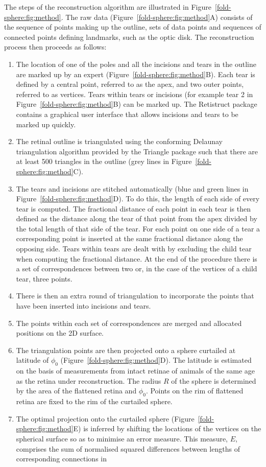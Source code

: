 \documentclass[10pt]{article}
\begin{document}
The steps of the reconstruction algorithm are illustrated in
Figure~\ref{fold-sphere:fig:method}. The raw data
(Figure~\ref{fold-sphere:fig:method}A) consists of the sequence of
points making up the outline, sets of data points and sequences of
connected points defining landmarks, such as the optic disk. The
reconstruction process then proceeds as follows:
\begin{enumerate}
\item The location of one of the poles and all the incisions and tears
  in the outline are marked up by an expert
  (Figure~\ref{fold-sphere:fig:method}B). Each tear is defined by a
  central point, referred to as the apex, and two outer points,
  referred to as vertices.  Tears within tears or incisions (for
  example tear 2 in Figure~\ref{fold-sphere:fig:method}B) can be
  marked up. The Retistruct package contains a graphical user
  interface that allows incisions and tears to be marked up quickly.
\item The retinal outline is triangulated using the conforming
  Delaunay triangulation algorithm provided by the Triangle package
  \cite{Shew96tria} such that there are at least 500 triangles in
  the outline (grey lines in Figure~\ref{fold-sphere:fig:method}C).
\item The tears and incisions are stitched automatically (blue and
  green lines in Figure~\ref{fold-sphere:fig:method}D). To do this,
  the length of each side of every tear is computed. The fractional
  distance of each point in each tear is then defined as the distance
  along the tear of that point from the apex divided by the total
  length of that side of the tear. For each point on one side of a
  tear a corresponding point is inserted at the same fractional
  distance along the opposing side. Tears within tears are dealt with
  by excluding the child tear when computing the fractional
  distance. At the end of the procedure there is a set of
  correspondences between two or, in the case of the vertices of a
  child tear, three points.
\item There is then an extra round of triangulation to incorporate the
  points that have been inserted into incisions and tears.
\item The points within each set of correspondences are merged and
  allocated positions on the 2D surface.
\item The triangulation points are then projected onto a sphere
  curtailed at latitude of $\phi_0$
  (Figure~\ref{fold-sphere:fig:method}D). The latitude is estimated on
  the basis of measurements from intact retinae of animals of the same
  age as the retina under reconstruction. The radius $R$ of the sphere
  is determined by the area of the flattened retina and $\phi_0$.
  Points on the rim of flattened retina are fixed to the rim of the
  curtailed sphere.
\item The optimal projection onto the curtailed sphere
  (Figure~\ref{fold-sphere:fig:method}E) is inferred by shifting the
  locations of the vertices on the spherical surface so as to minimise
  an error measure. This measure, $E$, comprises the sum of normalised
  squared differences between lengths of corresponding connections in


\end{enumerate}
\end{document}
